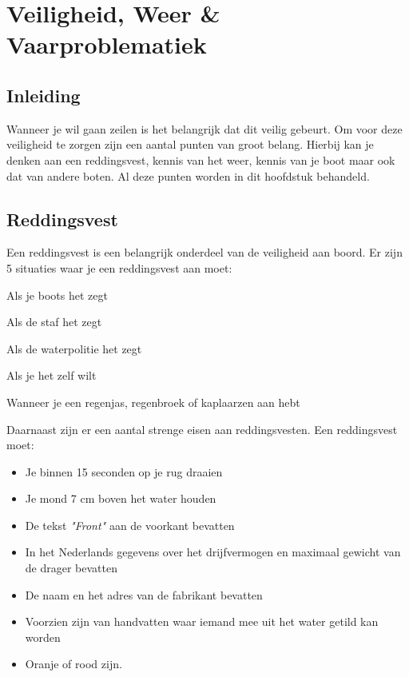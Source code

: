 \chapter{Veiligheid, Weer \& Vaarproblematiek}
\section{Inleiding}
Wanneer je wil gaan zeilen is het belangrijk dat dit veilig gebeurt. Om voor deze veiligheid te zorgen zijn een aantal punten van groot belang. Hierbij kan je denken aan een reddingsvest, kennis van het weer, kennis van je boot maar ook dat van andere boten. Al deze punten worden in dit hoofdstuk behandeld.
\section{Reddingsvest}
Een reddingsvest is een belangrijk onderdeel van de veiligheid aan boord. Er zijn 5 situaties waar je een reddingsvest aan moet:
\begin{enumerate}
\begin{multicols}{2}
    \item Als je boots het zegt
    \item Als de staf het zegt
    \item Als de waterpolitie het zegt 
    \item Als je het zelf wilt 
    \item Wanneer je een regenjas, regenbroek of kaplaarzen aan hebt
\end{multicols}
\end{enumerate}
Daarnaast zijn er een aantal strenge eisen aan reddingsvesten. Een reddingsvest moet:
\begin{itemize}%
    \item Je binnen 15 seconden op je rug draaien
    \item Je mond 7 cm boven het water houden
    \item De tekst \textit{"Front"} aan de voorkant bevatten
    \item In het Nederlands gegevens over het drijfvermogen en maximaal gewicht van de drager bevatten
    \item De naam en het adres van de fabrikant bevatten
    \item Voorzien zijn van handvatten waar iemand mee uit het water getild kan worden
    \item Oranje of rood zijn.
\end{itemize}

